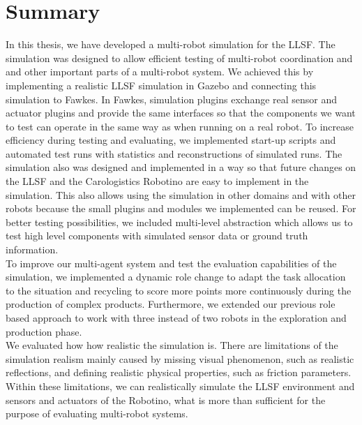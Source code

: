\section{Summary}
\label{sec:summery}
In this thesis, we have developed a multi-robot simulation for the LLSF. The simulation was designed to allow efficient testing of multi-robot coordination and and other important parts of a multi-robot system. We achieved this by implementing a realistic LLSF simulation in Gazebo and connecting this simulation to Fawkes. In Fawkes, simulation plugins exchange real sensor and actuator plugins and provide the same interfaces so that the components we want to test can operate in the same way as when running on a real robot. To increase efficiency during testing and evaluating, we implemented start-up scripts and automated test runs with statistics and reconstructions of simulated runs. The simulation also was designed and implemented in a way so that future changes on the LLSF and the Carologistics Robotino are easy to implement in the simulation. This also allows using the simulation in other domains and with other robots because the small plugins and modules we implemented can be reused. For better testing possibilities, we included multi-level abstraction which allows us to test high level components with simulated sensor data or ground truth information. \\
To improve our multi-agent system and test the evaluation capabilities of the simulation, we implemented a dynamic role change to adapt the task allocation to the situation and recycling to score more points more continuously during the production of complex products. Furthermore, we extended our previous role based approach to work with three instead of two robots in the exploration and production phase.\\
We evaluated how how realistic the simulation is. There are limitations of the simulation realism mainly caused by missing visual phenomenon, such as realistic reflections, and defining realistic physical properties, such as friction parameters. Within these limitations, we can realistically simulate the LLSF environment and sensors and actuators of the Robotino, what is more than sufficient for the purpose of evaluating multi-robot systems.\\

